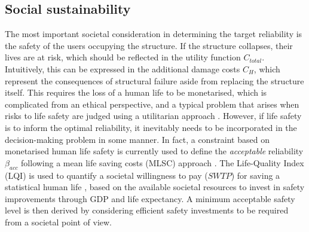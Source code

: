 \subsection{Social sustainability}
The most important societal consideration in determining the target reliability is the safety of the users occupying the structure.
If the structure collapses, their lives are at risk, which should be reflected in the utility function $C_{total}$.
Intuitively, this can be expressed in the additional damage costs $C_H$, which represent the consequences of structural failure aside from replacing the structure itself.
This requires the loss of a human life to be monetarised, which is complicated from an ethical perspective, and a typical problem that arises when risks to life safety are judged using a utilitarian approach \citep{vandePoel2011EthicsEngineering}.
However, if life safety is to inform the optimal reliability, it inevitably needs to be incorporated in the decision-making problem in some manner.
In fact, a constraint based on monetarised human life safety is currently used to define the \emph{acceptable} reliability $\beta_{acc}$ following a mean life saving costs (MLSC) approach \citep{Viljoen2012DerivingLQI}.
The Life-Quality Index (LQI) is used to quantify a societal willingness to pay ($SWTP$) for saving a statistical human life \citep{Pandey2004LifeSafety}, based on the available societal resources to invest in safety improvements through GDP and life expectancy.
A minimum acceptable safety level is then derived by considering efficient safety investments to be required from a societal point of view.

